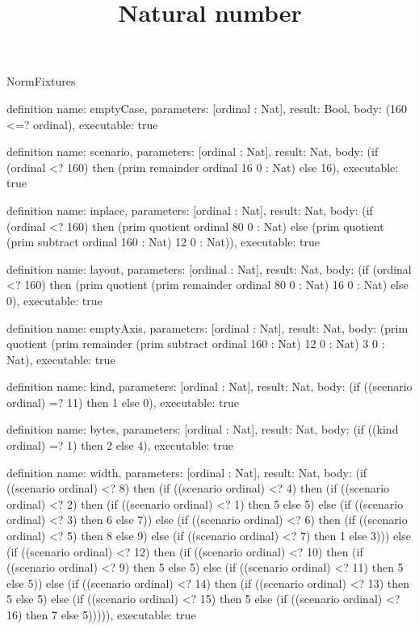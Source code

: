 \begin{lexlean}{NormFixtures}
\title{Natural number}
\begin{semanticmodule}
definition{
  name: emptyCase,
  parameters: [ordinal : Nat],
  result: Bool,
  body: (160 <=? ordinal),
  executable: true
}

definition{
  name: scenario,
  parameters: [ordinal : Nat],
  result: Nat,
  body: (if (ordinal <? 160) then (prim remainder ordinal 16 0 : Nat) else 16),
  executable: true
}

definition{
  name: inplace,
  parameters: [ordinal : Nat],
  result: Nat,
  body: (if (ordinal <? 160) then (prim quotient ordinal 80 0 : Nat) else (prim quotient (prim subtract ordinal 160 : Nat) 12 0 : Nat)),
  executable: true
}

definition{
  name: layout,
  parameters: [ordinal : Nat],
  result: Nat,
  body: (if (ordinal <? 160) then (prim quotient (prim remainder ordinal 80 0 : Nat) 16 0 : Nat) else 0),
  executable: true
}

definition{
  name: emptyAxis,
  parameters: [ordinal : Nat],
  result: Nat,
  body: (prim quotient (prim remainder (prim subtract ordinal 160 : Nat) 12 0 : Nat) 3 0 : Nat),
  executable: true
}

definition{
  name: kind,
  parameters: [ordinal : Nat],
  result: Nat,
  body: (if ((scenario ordinal) =? 11) then 1 else 0),
  executable: true
}

definition{
  name: bytes,
  parameters: [ordinal : Nat],
  result: Nat,
  body: (if ((kind ordinal) =? 1) then 2 else 4),
  executable: true
}

definition{
  name: width,
  parameters: [ordinal : Nat],
  result: Nat,
  body: (if ((scenario ordinal) <? 8) then (if ((scenario ordinal) <? 4) then (if ((scenario ordinal) <? 2) then (if ((scenario ordinal) <? 1) then 5 else 5) else (if ((scenario ordinal) <? 3) then 6 else 7)) else (if ((scenario ordinal) <? 6) then (if ((scenario ordinal) <? 5) then 8 else 9) else (if ((scenario ordinal) <? 7) then 1 else 3))) else (if ((scenario ordinal) <? 12) then (if ((scenario ordinal) <? 10) then (if ((scenario ordinal) <? 9) then 5 else 5) else (if ((scenario ordinal) <? 11) then 5 else 5)) else (if ((scenario ordinal) <? 14) then (if ((scenario ordinal) <? 13) then 5 else 5) else (if ((scenario ordinal) <? 15) then 5 else (if ((scenario ordinal) <? 16) then 7 else 5))))),
  executable: true
}


\end{semanticmodule}
\end{lexlean}
